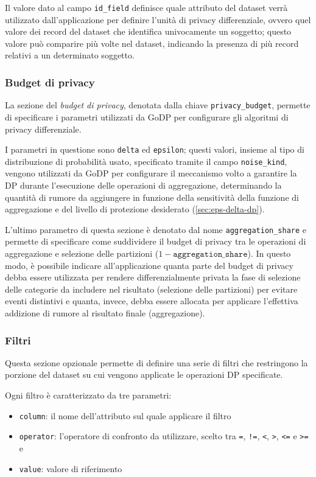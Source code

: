 Il valore dato al campo \texttt{id\_field} definisce quale attributo del dataset verrà utilizzato dall'applicazione per definire l'unità di privacy differenziale, ovvero quel valore dei record del dataset che identifica univocamente un soggetto; questo valore può comparire più volte nel dataset, indicando la presenza di più record relativi a un determinato soggetto.

\subsubsection{Budget di privacy}

La sezione del \textit{budget di privacy}, denotata dalla chiave \texttt{privacy\_budget}, permette di specificare i parametri utilizzati da GoDP per configurare gli algoritmi di privacy differenziale.

I parametri in questione sono \texttt{delta} ed \texttt{epsilon}; questi valori, insieme al tipo di distribuzione di probabilità usato, specificato tramite il campo \texttt{noise\_kind}, vengono utilizzati da GoDP per configurare il meccanismo volto a garantire la DP durante l'esecuzione delle operazioni di aggregazione, determinando la quantità di rumore da aggiungere in funzione della sensitività della funzione di aggregazione e del livello di protezione desiderato (\ref{sec:eps-delta-dp}).

L'ultimo parametro di questa sezione è denotato dal nome \texttt{aggregation\_share} e permette di specificare come suddividere il budget di privacy tra le operazioni di aggregazione e selezione delle partizioni ($1 - \texttt{aggregation\_share}$). In questo modo, è possibile indicare all'applicazione quanta parte del budget di privacy debba essere utilizzata per rendere differenzialmente privata la fase di selezione delle categorie da includere nel risultato (selezione delle partizioni) per evitare eventi distintivi e quanta, invece, debba essere allocata per applicare l'effettiva addizione di rumore al risultato finale (aggregazione).

\subsubsection{Filtri}

Questa sezione opzionale permette di definire una serie di filtri che restringono la porzione del dataset su cui vengono applicate le operazioni DP specificate.

Ogni filtro è caratterizzato da tre parametri:
\begin{itemize}
    \item \texttt{column}: il nome dell'attributo sul quale applicare il filtro
    \item \texttt{operator}: l'operatore di confronto da utilizzare, scelto tra \texttt{=}, \texttt{!=}, \texttt{<}, \texttt{>}, \texttt{<=} e \texttt{>=} e
    \item \texttt{value}: valore di riferimento
\end{itemize}

